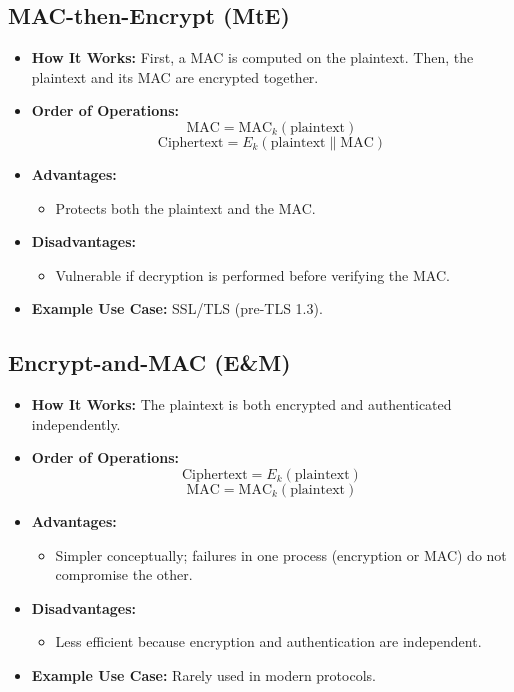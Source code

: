 \documentclass[12pt]{article}
\begin{document}
\subsection*{MAC-then-Encrypt (MtE)}
\begin{itemize}
    \item \textbf{How It Works:} First, a MAC is computed on the plaintext. Then, the plaintext and its MAC are encrypted together.
    \item \textbf{Order of Operations:}
    \[
    \text{MAC} = \mathrm{MAC}_k(\text{plaintext})
    \]
    \[
    \text{Ciphertext} = E_k(\text{plaintext} \| \text{MAC})
    \]
    \item \textbf{Advantages:}
    \begin{itemize}
        \item Protects both the plaintext and the MAC.
    \end{itemize}
    \item \textbf{Disadvantages:}
    \begin{itemize}
        \item Vulnerable if decryption is performed before verifying the MAC.
    \end{itemize}
    \item \textbf{Example Use Case:} SSL/TLS (pre-TLS 1.3).
\end{itemize}

\subsection*{Encrypt-and-MAC (E\&M)}
\begin{itemize}
    \item \textbf{How It Works:} The plaintext is both encrypted and authenticated independently.
    \item \textbf{Order of Operations:}
    \[
    \text{Ciphertext} = E_k(\text{plaintext})
    \]
    \[
    \text{MAC} = \mathrm{MAC}_k(\text{plaintext})
    \]
    \item \textbf{Advantages:}
    \begin{itemize}
        \item Simpler conceptually; failures in one process (encryption or MAC) do not compromise the other.
    \end{itemize}
    \item \textbf{Disadvantages:}
    \begin{itemize}
        \item Less efficient because encryption and authentication are independent.
    \end{itemize}
    \item \textbf{Example Use Case:} Rarely used in modern protocols.
\end{itemize}
\end{document}
